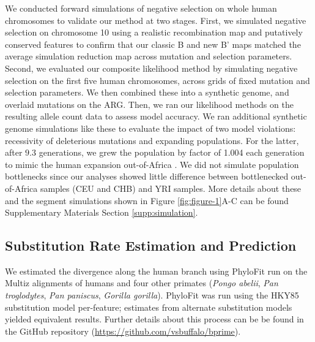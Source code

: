 \documentclass[11pt]{article}
\begin{document}
We conducted forward simulations of negative selection on whole human
chromosomes to validate our method at two stages. First, we simulated negative
selection on chromosome 10 using a realistic recombination map and putatively
conserved features to confirm that our classic B and new B' maps matched the
average simulation reduction map across mutation and selection parameters.
Second, we evaluated our composite likelihood method by simulating negative
selection on the first five human chromosomes, across grids of fixed mutation
and selection parameters. We then combined these into a synthetic genome, and
overlaid mutations on the ARG. Then, we ran our likelihood methods on the
resulting allele count data to assess model accuracy. We ran additional
synthetic genome simulations like these to evaluate the impact of two model
violations: recessivity of deleterious mutations and expanding populations. For
the latter, after $9.3$ generations, we grew the population by factor of 1.004
each generation to mimic the human expansion out-of-Africa
\parencite{Gutenkunst2009-pg}. We did not simulate population bottlenecks since
our analyses showed little difference between bottlenecked out-of-Africa
samples (CEU and CHB) and YRI samples. More details about these and the segment
simulations shown in Figure \ref{fig:figure-1}A-C can be found Supplementary
Materials Section \ref{supp:simulation}.

\subsection*{Substitution Rate Estimation and Prediction}
\label{sec:methods-sub}

We estimated the divergence along the human branch using PhyloFit
\parencite{Siepel2004-ql} run on the Multiz alignments
\parencite{Blanchette2004-bb} of humans and four other primates (\emph{Pongo
abelii}, \emph{Pan troglodytes}, \emph{Pan paniscus}, \emph{Gorilla gorilla}).
PhyloFit was run using the HKY85 substitution model per-feature; estimates from
alternate substitution models yielded equivalent results. Further details about
this process can be be found in the GitHub repository
(\url{https://github.com/vsbuffalo/bprime}).

\printbibliography
\end{document}
